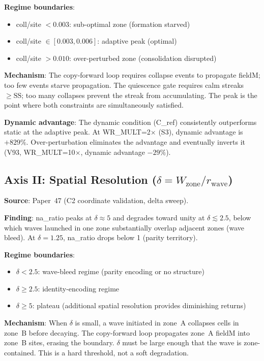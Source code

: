\documentclass[11pt,a4paper]{article}
\begin{document}
\textbf{Regime boundaries}:
\begin{itemize}
  \item coll/site $< 0.003$: sub-optimal zone (formation starved)
  \item coll/site $\in [0.003, 0.006]$: adaptive peak (optimal)
  \item coll/site $> 0.010$: over-perturbed zone (consolidation disrupted)
\end{itemize}

\textbf{Mechanism}: The copy-forward loop requires collapse events to propagate
fieldM; too few events starve propagation.
The quiescence gate requires calm streaks $\geq \mathrm{SS}$; too many
collapses prevent the streak from accumulating.
The peak is the point where both constraints are simultaneously satisfied.

\textbf{Dynamic advantage}: The dynamic condition (C\_ref) consistently
outperforms static at the adaptive peak.
At WR\_MULT=2$\times$ (S3), dynamic advantage is $+829\%$.
Over-perturbation eliminates the advantage and eventually inverts it (V93,
WR\_MULT=10$\times$, dynamic advantage $-29\%$).

\subsection{Axis II: Spatial Resolution ($\delta = W_\text{zone}/r_\text{wave}$)}

\textbf{Source}: Paper~47 (C2 coordinate validation, delta sweep).

\textbf{Finding}: na\_ratio peaks at $\delta \approx 5$ and degrades toward
unity at $\delta \lesssim 2.5$, below which waves launched in one zone
substantially overlap adjacent zones (wave bleed).
At $\delta = 1.25$, na\_ratio drops below 1 (parity territory).

\textbf{Regime boundaries}:
\begin{itemize}
  \item $\delta < 2.5$: wave-bleed regime (parity encoding or no structure)
  \item $\delta \geq 2.5$: identity-encoding regime
  \item $\delta \geq 5$: plateau (additional spatial resolution provides
    diminishing returns)
\end{itemize}

\textbf{Mechanism}: When $\delta$ is small, a wave initiated in zone~A
collapses cells in zone~B before decaying.
The copy-forward loop propagates zone~A fieldM into zone~B sites, erasing
the boundary.
$\delta$ must be large enough that the wave is zone-contained.
This is a hard threshold, not a soft degradation.
\end{document}
